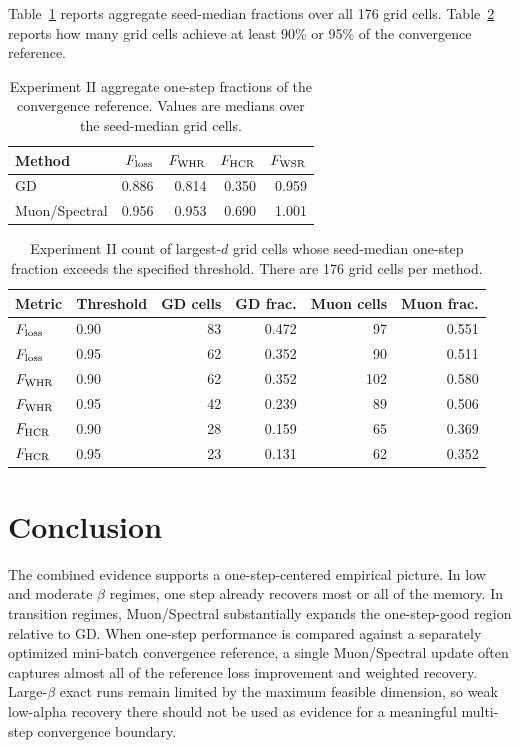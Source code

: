 \documentclass[11pt]{article}
\begin{document}
Table~\ref{tab:exp2-method-summary} reports aggregate seed-median fractions
over all 176 grid cells.  Table~\ref{tab:exp2-threshold-main} reports how
many grid cells achieve at least 90\% or 95\% of the convergence reference.

\begin{table}[H]
\centering
\caption{Experiment II aggregate one-step fractions of the convergence
reference.  Values are medians over the seed-median grid cells.}
\small
\begin{tabular}{lrrrr}
\toprule
Method & $F_{\rm loss}$ & $F_{\rm WHR}$ & $F_{\rm HCR}$ & $F_{\rm WSR}$ \\
\midrule
GD & 0.886 & 0.814 & 0.350 & 0.959 \\
Muon/Spectral & 0.956 & 0.953 & 0.690 & 1.001 \\
\bottomrule
\end{tabular}
\label{tab:exp2-method-summary}
\end{table}

\begin{table}[H]
\centering
\caption{Experiment II count of largest-$d$ grid cells whose seed-median
one-step fraction exceeds the specified threshold.  There are 176 grid cells
per method.}
\small
\begin{tabular}{llrrrr}
\toprule
Metric & Threshold & GD cells & GD frac. & Muon cells & Muon frac. \\
\midrule
$F_{\rm loss}$ & 0.90 & 83 & 0.472 & 97 & 0.551 \\
$F_{\rm loss}$ & 0.95 & 62 & 0.352 & 90 & 0.511 \\
$F_{\rm WHR}$ & 0.90 & 62 & 0.352 & 102 & 0.580 \\
$F_{\rm WHR}$ & 0.95 & 42 & 0.239 & 89 & 0.506 \\
$F_{\rm HCR}$ & 0.90 & 28 & 0.159 & 65 & 0.369 \\
$F_{\rm HCR}$ & 0.95 & 23 & 0.131 & 62 & 0.352 \\
\bottomrule
\end{tabular}
\label{tab:exp2-threshold-main}
\end{table}

\section{Conclusion}

The combined evidence supports a one-step-centered empirical picture.  In
low and moderate $\beta$ regimes, one step already recovers most or all of
the memory.  In transition regimes, Muon/Spectral substantially expands the
one-step-good region relative to GD.  When one-step performance is compared
against a separately optimized mini-batch convergence reference, a single
Muon/Spectral update often captures almost all of the reference loss
improvement and weighted recovery.  Large-$\beta$ exact runs remain limited
by the maximum feasible dimension, so weak low-alpha recovery there should
not be used as evidence for a meaningful multi-step convergence boundary.
\end{document}
